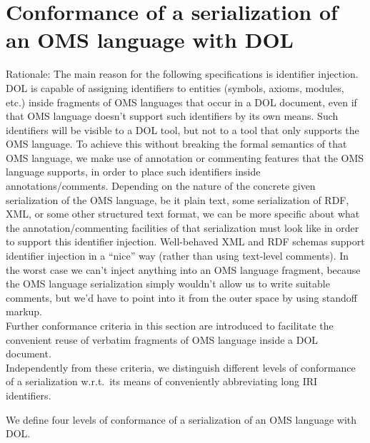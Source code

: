 \documentclass[10pt,%
\ifpretendfinal
final%
\else
draft%
\fi,
]{scrreprt}
\newcommand{\sclause}[1]{\section{#1}}
\begin{document}
\sclause{Conformance of a serialization of an OMS language with DOL}\label{c:conform:serialization}

Rationale: The main reason for the following specifications is identifier injection.  DOL is capable of assigning identifiers to entities (symbols, axioms, modules, etc.) inside fragments of OMS languages that occur in a DOL document, even if that OMS language doesn't support such identifiers by its own means.  Such identifiers will be visible to a DOL tool, but not to a tool that only supports the OMS language.  To achieve this without breaking the formal semantics of that OMS language, we make use of annotation or commenting features that the OMS language supports, in order to place such identifiers inside annotations/comments.  Depending on the nature of the concrete given serialization of the OMS language, be it plain text, some serialization of RDF, XML, or some other structured text format, we can be more specific about what the annotation/commenting facilities of that serialization must look like in order to support this identifier injection.  Well-behaved XML and RDF schemas support identifier injection in a “nice” way (rather than using text-level comments).  In the worst case we can't inject anything into an OMS language fragment, because the OMS language serialization simply wouldn't allow us to write suitable comments, but we'd have to point into it from the outer space by using standoff markup.\\
Further conformance criteria in this section are introduced to facilitate the convenient reuse of verbatim fragments of OMS language inside a DOL document.\\
Independently from these criteria, we distinguish different levels of conformance of a serialization w.r.t.\ its means of conveniently abbreviating long IRI identifiers.

We define four levels of conformance of a serialization of an OMS language with DOL.
\end{document}
